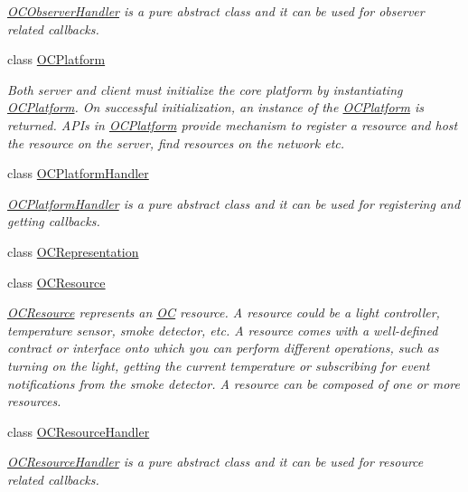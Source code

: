 \begin{DoxyCompactItemize}
\begin{DoxyCompactList}\small\item\em \hyperlink{classOC_1_1OCObserverHandler}{O\+C\+Observer\+Handler} is a pure abstract class and it can be used for observer related callbacks. \end{DoxyCompactList}\item 
class \hyperlink{classOC_1_1OCPlatform}{O\+C\+Platform}
\begin{DoxyCompactList}\small\item\em Both server and client must initialize the core platform by instantiating \hyperlink{classOC_1_1OCPlatform}{O\+C\+Platform}. On successful initialization, an instance of the \hyperlink{classOC_1_1OCPlatform}{O\+C\+Platform} is returned. A\+P\+Is in \hyperlink{classOC_1_1OCPlatform}{O\+C\+Platform} provide mechanism to register a resource and host the resource on the server, find resources on the network etc. \end{DoxyCompactList}\item 
class \hyperlink{classOC_1_1OCPlatformHandler}{O\+C\+Platform\+Handler}
\begin{DoxyCompactList}\small\item\em \hyperlink{classOC_1_1OCPlatformHandler}{O\+C\+Platform\+Handler} is a pure abstract class and it can be used for registering and getting callbacks. \end{DoxyCompactList}\item 
class \hyperlink{classOC_1_1OCRepresentation}{O\+C\+Representation}
\item 
class \hyperlink{classOC_1_1OCResource}{O\+C\+Resource}
\begin{DoxyCompactList}\small\item\em \hyperlink{classOC_1_1OCResource}{O\+C\+Resource} represents an \hyperlink{namespaceOC}{O\+C} resource. A resource could be a light controller, temperature sensor, smoke detector, etc. A resource comes with a well-\/defined contract or interface onto which you can perform different operations, such as turning on the light, getting the current temperature or subscribing for event notifications from the smoke detector. A resource can be composed of one or more resources. \end{DoxyCompactList}\item 
class \hyperlink{classOC_1_1OCResourceHandler}{O\+C\+Resource\+Handler}
\begin{DoxyCompactList}\small\item\em \hyperlink{classOC_1_1OCResourceHandler}{O\+C\+Resource\+Handler} is a pure abstract class and it can be used for resource related callbacks. \end{DoxyCompactList}\item 

\end{DoxyCompactItemize}

